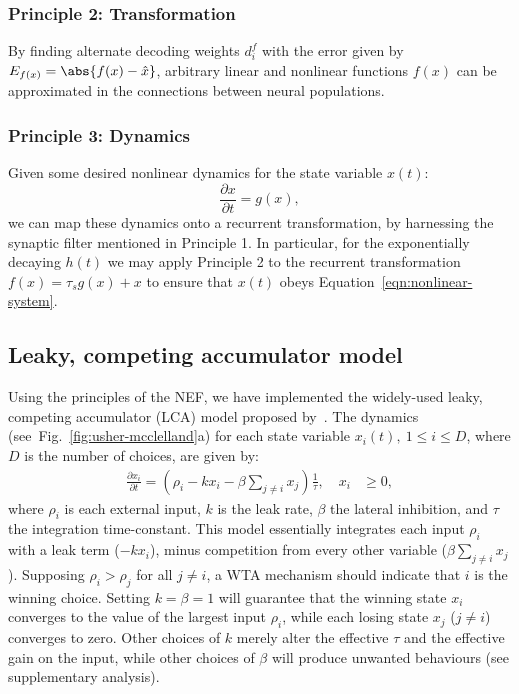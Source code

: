 \documentclass[10pt,letterpaper]{article}
\begin{document}
\subsubsection{Principle 2: Transformation}
By finding alternate decoding weights $d^f_i$ with the error given by $E_{f(x)} = \abs{f(x) - \hat x}$, arbitrary linear and nonlinear functions $f(x)$ can be approximated in the connections between neural populations.

\subsubsection{Principle 3: Dynamics}
Given some desired nonlinear dynamics for the state variable $x(t)$:
\begin{equation} \label{eqn:nonlinear-system}
    \frac{\partial x}{\partial t} = g(x) ,
\end{equation}
we can map these dynamics onto a recurrent transformation, by harnessing the synaptic filter mentioned in Principle 1.
In particular, for the exponentially decaying $h(t)$ we may apply Principle 2 to the recurrent transformation $f(x) = \tau_s g(x) + x$ to ensure that $x(t)$ obeys Equation~\ref{eqn:nonlinear-system}.

\subsection{Leaky, competing accumulator model}
Using the principles of the NEF, we have implemented the widely-used leaky, competing accumulator (LCA) model proposed by~.
The dynamics (see~Fig.~\ref{fig:usher-mcclelland}a) for each state variable $x_i(t),\ 1 \leq i \leq D$, where $D$ is the number of choices, are given by:
\begin{equation} \label{eqn:usher-mcclelland}
    \begin{split}
        \frac{{\partial x}_i}{\partial t} = \left(\rho_i - kx_i - \beta \sum_{j \neq i} x_j\right) \frac{1}{\tau}, \quad x_i &\ge 0,
    \end{split}
\end{equation}
where $\rho_i$ is each external input, $k$ is the leak rate, $\beta$ the lateral inhibition, and $\tau$ the integration time-constant.
This model essentially integrates each input $\rho_i$ with a leak term ($- kx_i$), minus competition from every other variable ($\beta \sum_{j \neq i} x_j$).
Supposing $\rho_i > \rho_j$ for all $j \ne i$, a WTA mechanism should indicate that $i$ is the winning choice.
Setting $k = \beta = 1$ will guarantee that the winning state $x_i$ converges to the value of the largest input $\rho_i$, while each losing state $x_j$ ($j \ne i$) converges to zero.
Other choices of $k$ merely alter the effective $\tau$ and the effective gain on the input, while other choices of $\beta$ will produce unwanted behaviours (see supplementary analysis).
\end{document}
